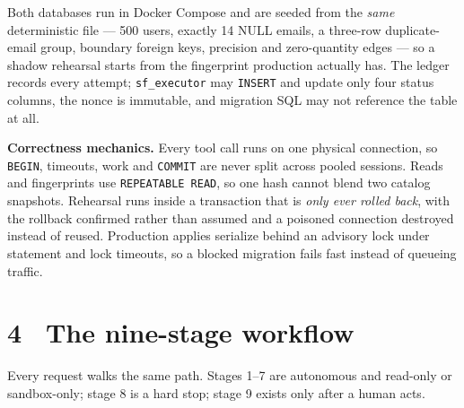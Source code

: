 \documentclass[8pt,a4paper]{extarticle}
\newcommand{\code}[1]{\texttt{\small #1}}
\begin{document}
\begin{center}
\end{center}

\vspace{-0.6ex}
Both databases run in Docker Compose and are seeded from the \emph{same} deterministic file --- 500 users, exactly 14 NULL emails, a three-row duplicate-email group, boundary foreign keys, precision and zero-quantity edges --- so a shadow rehearsal starts from the fingerprint production actually has. The ledger records every attempt; \code{sf\_executor} may \code{INSERT} and update only four status columns, the nonce is immutable, and migration SQL may not reference the table at all.

\textbf{Correctness mechanics.} Every tool call runs on one physical connection, so \code{BEGIN}, timeouts, work and \code{COMMIT} are never split across pooled sessions. Reads and fingerprints use \code{REPEATABLE READ}, so one hash cannot blend two catalog snapshots. Rehearsal runs inside a transaction that is \emph{only ever rolled back}, with the rollback confirmed rather than assumed and a poisoned connection destroyed instead of reused. Production applies serialize behind an advisory lock under statement and lock timeouts, so a blocked migration fails fast instead of queueing traffic.

\section*{4 \textperiodcentered\ The nine-stage workflow}
Every request walks the same path. Stages 1--7 are autonomous and read-only or sandbox-only; stage 8 is a hard stop; stage 9 exists only after a human acts.
\end{document}
